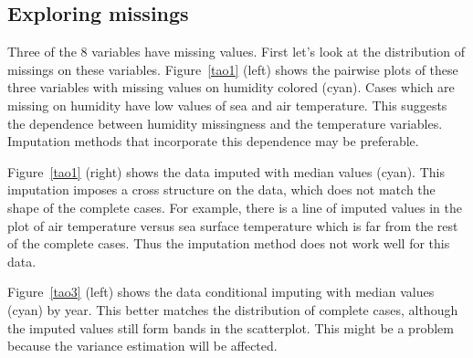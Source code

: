 \documentclass[article]{jss}
\begin{document}
\subsection{Exploring missings}

Three of the 8 variables have missing values. First let's look at the distribution of missings on these variables. Figure~\ref{tao1} (left) shows the pairwise plots of these three variables with missing values on humidity colored (cyan). Cases which are missing on humidity have low values of sea and air temperature. This suggests the dependence between humidity missingness and the temperature variables. Imputation methods that incorporate this dependence may be preferable.

Figure~\ref{tao1} (right) shows the data imputed with median values (cyan). This imputation imposes a cross structure on the data, which does not match the shape of the complete cases. For example, there is a line of imputed values in the plot of air temperature versus sea surface temperature which is far from the rest of the complete cases. Thus the imputation method does not work well for this data.

Figure~\ref{tao3} (left) shows the data conditional imputing with median values (cyan) by year. This better matches the distribution of complete cases, although the imputed values still form bands in the scatterplot. This might be a problem because the variance estimation will be affected. 
\end{document}
